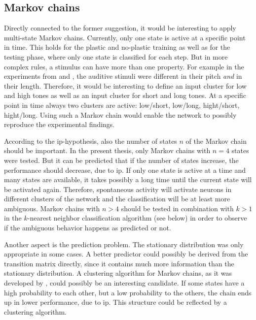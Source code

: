 \subsection{Markov chains}

Directly connected to the former suggestion, it would be interesting to apply multi-state Markov chains. Currently, only one state is active at a specific point in time. This holds for the plastic and no-plastic training as well as for the testing phase, where only one state is classified for each step. But in more complex rules, a stimulus can have more than one property. For example in the experiments from \textcite{paavilainen2007preattentive} and \textcite{bendixen2008rapid}, the auditive stimuli were different in their pitch \emph{and} in their length. Therefore, it would be interesting to define an input cluster for low and high tones as well as an input cluster for short and long tones. At a specific point in time always two clusters are active: low/short, low/long, hight/short, hight/long. Using such a Markov chain would enable the network to possibly reproduce the experimental findings.

According to the \acs{ip}-hypothesis, also the number of states $n$ of the Markov chain should be important. In the present thesis, only Markov chains with $n=4$ states were tested. But it can be predicted that if the number of states increase, the performance should decrease, due to \acl{ip}. If only one state is active at a time and many states are available, it takes possibly a long time until the current state will be activated again. Therefore, spontaneous activity will activate neurons in different clusters of the network and the classification will be at least more ambiguous. Markov chains with $n > 4$ should be tested in combination with $k > 1$ in the $k$-nearest neighbor classification algorithm (see below) in order to observe if the ambiguous behavior happens as predicted or not.

Another aspect is the prediction problem. The stationary distribution was only appropriate in some cases. A better predictor could possibly be derived from the transition matrix directly, since it contains much more information than the stationary distribution. A clustering algorithm for Markov chains, as it was developed by \textcite{van2001graph}, could possibly be an interesting candidate. If some states have a high probability to each other, but a low probability to the others, the chain ends up in lower performance, due to \acl{ip}. This structure could be reflected by a clustering algorithm.

